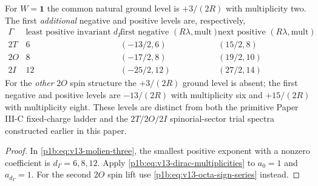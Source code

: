 \documentclass[11pt]{article}
\begin{document}
\begin{corollary}
\label{p1b:cor:v13-first-dirac-levels}
For $W=\mathbf1$ the common natural ground level is
$+3/(2R)$ with multiplicity two.  The first \emph{additional}
negative and positive levels are, respectively,
\[
\begin{array}{c|c|c|c}
\Gamma & \text{least positive invariant degree }d_\Gamma
  & \text{first negative }(R\lambda,\mathrm{mult})
  & \text{next positive }(R\lambda,\mathrm{mult})\\\hline
2T&6&(-13/2,6)&(15/2,8)\\
2O&8&(-17/2,8)&(19/2,10)\\
2I&12&(-25/2,12)&(27/2,14)
\end{array}
\]
For the \emph{other} $2O$ spin structure the $+3/(2R)$ ground
level is absent; the first negative and positive levels are
$-13/(2R)$ with multiplicity six and $+15/(2R)$ with multiplicity
eight. These levels are distinct from both the primitive Paper III-C
fixed-charge ladder and the $2T/2O/2I$ spinorial-sector trial
spectra constructed earlier in this paper.
\end{corollary}
\begin{proof}
In \eqref{p1b:eq:v13-molien-three}, the smallest positive exponent
with a nonzero coefficient is $d_\Gamma=6,8,12$.
Apply \eqref{p1b:eq:v13-dirac-multiplicities} to $a_0=1$ and
$a_{d_\Gamma}=1$.  For the second $2O$ spin lift use
\eqref{p1b:eq:v13-octa-sign-series} instead.
\end{proof}
\end{document}
